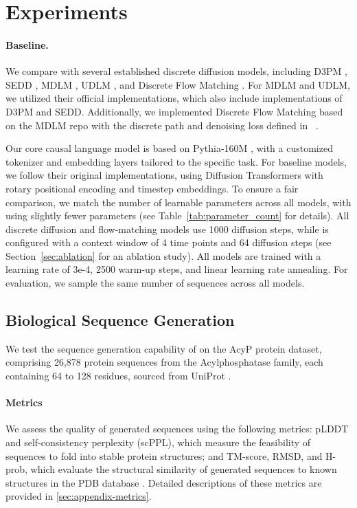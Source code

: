 
\section{Experiments}

\paragraph{Baseline.} We compare \method{} with several established discrete diffusion models, including D3PM \cite{d3pm}, SEDD \cite{lou2024discretediffusionmodelingestimating}, MDLM \cite{mdlm}, UDLM \cite{udlm}, and Discrete Flow Matching \cite{gat2024discreteflowmatching}. For MDLM and UDLM, we utilized their official implementations, which also include implementations of D3PM and SEDD. Additionally, we implemented Discrete Flow Matching based on the MDLM repo with the discrete path and denoising loss defined in ~\citep{gat2024discreteflowmatching}.

Our core causal language model is based on Pythia-160M \cite{biderman2023pythiasuiteanalyzinglarge}, with a customized tokenizer and embedding layers tailored to the specific task. For baseline models, we follow their original implementations, using Diffusion Transformers \cite{peebles2023scalablediffusionmodelstransformers} with rotary positional encoding and timestep embeddings.
To ensure a fair comparison, we match the number of learnable parameters across all models, with \method{} using slightly fewer parameters (see Table~\ref{tab:parameter_count} for details). All discrete diffusion and flow-matching models use 1000 diffusion steps, while \method{} is configured with a context window of 4 time points and 64 diffusion steps (see Section~\ref{sec:ablation} for an ablation study).
All models are trained with a learning rate of 3e-4, 2500 warm-up steps, and linear learning rate annealing. For evaluation, we sample the same number of sequences across all models.




\subsection{Biological Sequence Generation}
We test the sequence generation capability of \method{} on the AcyP protein dataset, comprising 26,878 protein sequences from the Acylphosphatase family, each containing 64 to 128 residues, sourced from UniProt \citep{10.1093/nar/gkae1010}.

\paragraph{Metrics}
We assess the quality of generated sequences using the following metrics: pLDDT \citep{Jumper2021} and self-consistency perplexity (scPPL), which measure the feasibility of sequences to fold into stable protein structures; and TM-score, RMSD, and H-prob, which evaluate the structural similarity of generated sequences to known structures in the PDB database \citep{Berman2000-ql}. Detailed descriptions of these metrics are provided in \ref{sec:appendix-metrics}.

